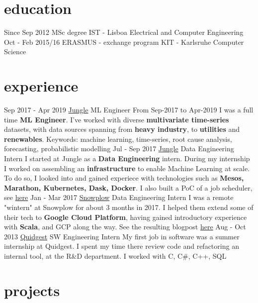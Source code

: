 \documentclass[]{colobas-cv}
\begin{document}
\section{education}
\entry
  {Since Sep 2012}
  {MSc degree}
  {IST - Lisboa}
  {Electrical and Computer Engineering}
\entry
  {Oct - Feb 2015/16}
  {ERASMUS - exchange program}
  {KIT - Karlsruhe}
  {Computer Science}

\section{experience}
\entry
  {Sep 2017 - Apr 2019}
  {\href{https://jungle.ai}{Jungle}}
  {ML Engineer}
  {From Sep-2017 to Apr-2019 I was a full time \textbf{ML Engineer}. I've worked with diverse 
  \textbf{multivariate time-series} datasets, with data sources spanning from 
  \textbf{heavy industry}, to \textbf{utilities} and \textbf{renewables}.
  Keywords: machine learning, time-series, root cause analysis, forecasting,
  probabilistic modelling}
\entry
  {Jul - Sep 2017}
  {\href{https://jungle.ai}{Jungle}}
  {Data Engineering Intern}
  {I started at Jungle as a \textbf{Data Engineering} intern. During my internship I
  worked on assembling an \textbf{infrastructure} to enable Machine Learning at scale.
  To do so, I looked into and gained experiece with technologies such as
  \textbf{Mesos, Marathon, Kubernetes, Dask, Docker}. I also built a PoC of a
  job scheduler, see \href{https://github.com/colobas/obras}{here}}
\entry
  {Jan - Mar 2017}
  {\href{https://snowplowanalytics.com}{Snowplow}}
  {Data Engineering Intern}
  {I was a remote "wintern" at Snowplow for about 3 months in 2017. I helped
  them extend some of their tech to \textbf{Google Cloud Platform}, having gained 
  introductory experience with \textbf{Scala}, and GCP along the way. See the
  resulting blogpost \href{https://snowplowanalytics.com/blog/2017/03/30/google-cloud-dataflow-example-project-released/}{here}}
\entry
  {Aug - Oct 2013}
  {\href{https://quidgest.com}{Quidgest}}
  {SW Engineering Intern}
  {My first job in software was a summer internship at Quidgest. I spent my time
  there review code and refactoring an internal tool, at the R\&D department.
  I worked with C, C\#, C++, SQL}
\section{projects}
\end{document}
